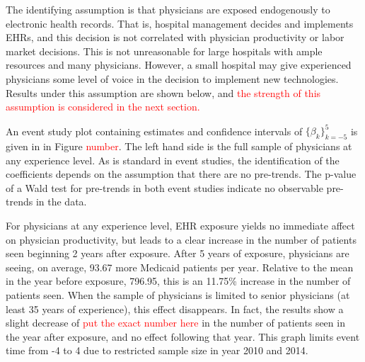 \documentclass[11pt]{article}
\begin{document}
The identifying assumption is that physicians are exposed endogenously to electronic health records. That is, hospital management decides and implements EHRs, and this decision is not correlated with physician productivity or labor market decisions. This is not unreasonable for large hospitals with ample resources and many physicians. However, a small hospital may give experienced physicians some level of voice in the decision to implement new technologies. Results under this assumption are shown below, and  \textcolor{red}{the strength of this assumption is considered in the next section. } 

An event study plot containing estimates and confidence intervals of  $\{\beta_k\}_{k=-5}^5$  is given in in Figure \textcolor{red}{number}. The left hand side is the full sample of physicians at any experience level. As is standard in event studies, the identification of the coefficients depends on the assumption that there are no pre-trends. The p-value of a Wald test for pre-trends in both event studies indicate no observable pre-trends in the data.

For physicians at any experience level, EHR exposure yields no immediate affect on physician productivity, but leads to a clear increase in the number of patients seen beginning 2 years after exposure. After 5 years of exposure, physicians are seeing, on average, 93.67 more Medicaid patients per year. Relative to the mean in the year before exposure, 796.95, this is an 11.75\% increase in the number of patients seen. When the sample of physicians is limited to senior physicians (at least 35 years of experience), this effect disappears. In fact, the results show a slight decrease of \textcolor{red}{put the exact number here} in the number of patients seen in the year after exposure, and no effect following that year. This graph limits event time from -4 to 4 due to restricted sample size in year 2010 and 2014. 
\end{document}
